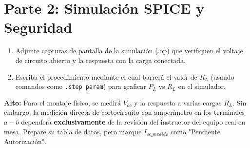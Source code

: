 \documentclass[11pt, a4paper]{article}
\begin{document}
\section*{Parte 2: Simulación SPICE y Seguridad}
\begin{enumerate}
    \item Adjunte capturas de pantalla de la simulación (.op) que verifiquen el voltaje de circuito abierto y la respuesta con la carga conectada.
    \item Escriba el procedimiento mediante el cual barrerá el valor de $R_L$ (usando comandos como \texttt{.step param}) para graficar $P_L$ vs $R_L$ en el simulador.
\end{enumerate}

\begin{tcolorbox}[colback=red!5!white, colframe=red!80!black, title=Gate de Seguridad Experimental para $\bm{I_{sc}}$]
    \textbf{Alto:} Para el montaje físico, se medirá $V_{oc}$ y la respuesta a varias cargas $R_L$. Sin embargo, la medición directa de cortocircuito con amperímetro en los terminales $a-b$ dependerá \textbf{exclusivamente} de la revisión del instructor del equipo real en mesa. Prepare su tabla de datos, pero marque $I_{sc\_medido}$ como "Pendiente Autorización".
\end{tcolorbox}
\end{document}
